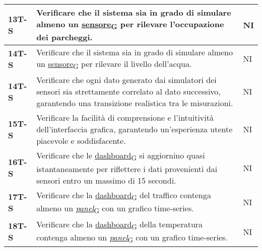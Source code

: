 \begin{longtable}{|>{\raggedright\arraybackslash}m{}|>{\raggedright\arraybackslash}m{}|>{\raggedright\arraybackslash}m{}|}
	\hline
	\textbf{13T-S}  & Verificare che il sistema sia in grado di simulare almeno un \href{https://7last.github.io/docs/pb/documentazione-interna/glossario\#sensore}{sensore\textsubscript{G}} per rilevare l'occupazione dei parcheggi.                                                                                   & NI             \\
	\hline
	\textbf{14T-S}  & Verificare che il sistema sia in grado di simulare almeno un \href{https://7last.github.io/docs/pb/documentazione-interna/glossario\#sensore}{sensore\textsubscript{G}} per rilevare il livello dell'acqua.                                                                                         & NI             \\
	\hline
	\textbf{14T-S}  & Verificare che ogni dato generato dai simulatori dei sensori sia strettamente correlato al dato successivo, garantendo una transizione realistica tra le misurazioni.                            & NI             \\
	\hline
	\textbf{15T-S}  & Verificare la facilità di comprensione e l'intuitività dell'interfaccia grafica, garantendo un'esperienza utente piacevole e soddisfacente.                                                      & NI             \\
	\hline
	\textbf{16T-S}  & Verificare che le \href{https://7last.github.io/docs/pb/documentazione-interna/glossario\#dashboard}{dashboard\textsubscript{G}} si aggiornino quasi istantaneamente per riflettere i dati provenienti dai sensori entro un massimo di 15 secondi.                                                    & NI             \\
	\hline
	\textbf{17T-S}  & Verificare che la \href{https://7last.github.io/docs/pb/documentazione-interna/glossario\#dashboard}{dashboard\textsubscript{G}} del traffico contenga almeno un \href{https://7last.github.io/docs/pb/documentazione-interna/glossario\#panel}{\textit{panel}\textsubscript{G}} con un grafico time-series.                                                                                           & NI             \\
	\hline
	\textbf{18T-S}  & Verificare che la \href{https://7last.github.io/docs/pb/documentazione-interna/glossario\#dashboard}{dashboard\textsubscript{G}} della temperatura contenga almeno un \href{https://7last.github.io/docs/pb/documentazione-interna/glossario\#panel}{\textit{panel}\textsubscript{G}} con un grafico time-series.                                                                                      & NI             \\

\end{longtable}
